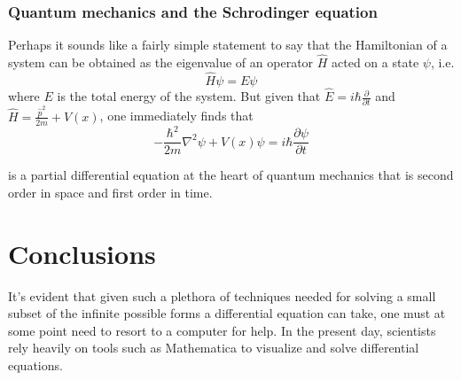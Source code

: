 \documentclass{article}
\begin{document}
	\subsubsection{Quantum mechanics and the Schrodinger equation}
	
	Perhaps it sounds like a fairly simple statement to say that the Hamiltonian of a system can be obtained as the eigenvalue of an operator $\hat{H}$ acted on a state $\psi$, i.e. $$ \hat{H}\psi = E\psi$$ where $E$ is the total energy of the system. But given that $\hat{E} = i\hbar \frac{\partial}{\partial t}$ and $ \hat{H} = \frac{\hat{p}^2}{2m} + V(x)$, one immediately finds that $$ -\frac{\hbar^2}{2m}\nabla^2\psi + V(x)\psi = i\hbar\frac{\partial \psi}{\partial t}$$
	
	is a partial differential equation at the heart of quantum mechanics that is second order in space and first order in time.
	
	\section{Conclusions}
	It's evident that given such a plethora of techniques needed for solving a small subset of the infinite possible forms a differential equation can take, one must at some point need to resort to a computer for help. In the present day, scientists rely heavily on tools such as Mathematica to visualize and solve differential equations.
\end{document}
